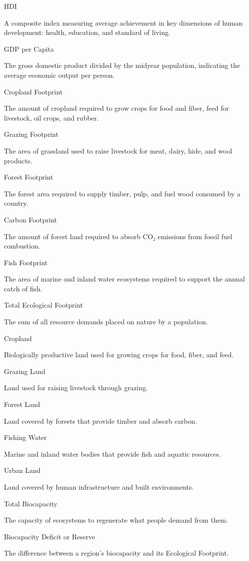 \documentclass[
]{article}
\begin{document}
HDI

A composite index measuring average achievement in key dimensions of
human development: health, education, and standard of living.

GDP per Capita

The gross domestic product divided by the midyear population, indicating
the average economic output per person.

Cropland Footprint

The amount of cropland required to grow crops for food and fiber, feed
for livestock, oil crops, and rubber.

Grazing Footprint

The area of grassland used to raise livestock for meat, dairy, hide, and
wool products.

Forest Footprint

The forest area required to supply timber, pulp, and fuel wood consumed
by a country.

Carbon Footprint

The amount of forest land required to absorb CO₂ emissions from fossil
fuel combustion.

Fish Footprint

The area of marine and inland water ecosystems required to support the
annual catch of fish.

Total Ecological Footprint

The sum of all resource demands placed on nature by a population.

Cropland

Biologically productive land used for growing crops for food, fiber, and
feed.

Grazing Land

Land used for raising livestock through grazing.

Forest Land

Land covered by forests that provide timber and absorb carbon.

Fishing Water

Marine and inland water bodies that provide fish and aquatic resources.

Urban Land

Land covered by human infrastructure and built environments.

Total Biocapacity

The capacity of ecosystems to regenerate what people demand from them.

Biocapacity Deficit or Reserve

The difference between a region's biocapacity and its Ecological
Footprint.
\end{document}
